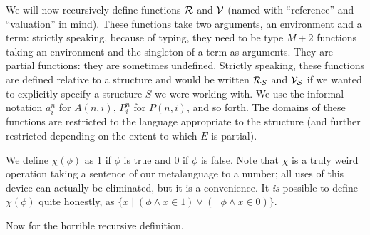 \documentclass[12pt]{book}
\begin{document}
We will now recursively define functions $\cal R$ and $\cal V$ (named
with ``reference'' and ``valuation'' in mind).  These functions take
two arguments, an environment and a term:  strictly speaking, because of typing, they need to be type $M+2$ functions taking an environment and the singleton of a term as arguments.  They are partial functions:
they are sometimes undefined.  Strictly speaking, these functions are
defined relative to a structure and would be written $\cal R_S$ and
$\cal V_S$ if we wanted to explicitly specify a structure $S$ we were
working with.  We use the informal notation $a^n_i$ for $A(n,i)$, $P^n_i$ for $P(n,i)$, and so forth.  The domains of these
functions are restricted to the language appropriate to the structure
(and further restricted depending on the extent to which $E$ is
partial).

We define $\chi(\phi)$ as 1 if $\phi$ is true and 0 if $\phi$ is false.  Note that $\chi$ is a truly weird operation
taking a sentence of our metalanguage to a number; all uses of this device can actually be eliminated, but it is a convenience.  It {\em is\/} possible to
define $\chi(\phi)$ quite honestly, as $\{x\mid (\phi \wedge x \in 1) \vee (\neg \phi \wedge x \in 0)\}$.

\newpage

Now for the horrible recursive definition.
\end{document}
